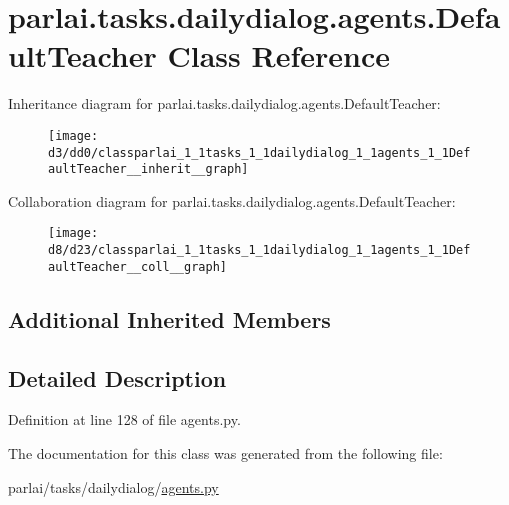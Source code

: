 \hypertarget{classparlai_1_1tasks_1_1dailydialog_1_1agents_1_1DefaultTeacher}{}\section{parlai.\+tasks.\+dailydialog.\+agents.\+Default\+Teacher Class Reference}
\label{classparlai_1_1tasks_1_1dailydialog_1_1agents_1_1DefaultTeacher}


Inheritance diagram for parlai.\+tasks.\+dailydialog.\+agents.\+Default\+Teacher\+:\nopagebreak
\begin{figure}[H]
\begin{center}
\leavevmode
\texttt{[image: d3/dd0/classparlai\_1\_1tasks\_1\_1dailydialog\_1\_1agents\_1\_1DefaultTeacher\_\_inherit\_\_graph]}
\end{center}
\end{figure}


Collaboration diagram for parlai.\+tasks.\+dailydialog.\+agents.\+Default\+Teacher\+:\nopagebreak
\begin{figure}[H]
\begin{center}
\leavevmode
\texttt{[image: d8/d23/classparlai\_1\_1tasks\_1\_1dailydialog\_1\_1agents\_1\_1DefaultTeacher\_\_coll\_\_graph]}
\end{center}
\end{figure}
\subsection*{Additional Inherited Members}


\subsection{Detailed Description}


Definition at line 128 of file agents.\+py.



The documentation for this class was generated from the following file\+:\begin{DoxyCompactItemize}
\item 
parlai/tasks/dailydialog/\hyperlink{parlai_2tasks_2dailydialog_2agents_8py}{agents.\+py}\end{DoxyCompactItemize}

